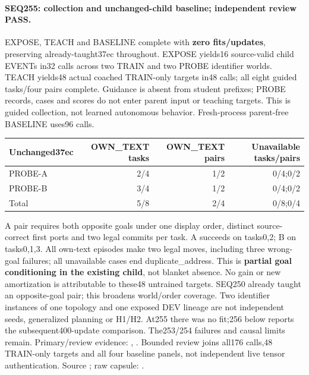 \documentclass{article}
\begin{document}
\paragraph{SEQ255: collection and unchanged-child baseline; independent review PASS.}
EXPOSE, TEACH and BASELINE complete with \textbf{zero fits/updates}, preserving
already-taught37ec throughout. EXPOSE yields16 source-valid child EVENTs
in32 calls across two TRAIN and two PROBE identifier worlds. TEACH yields48
actual coached TRAIN-only targets in48 calls; all eight guided tasks/four pairs
complete. Guidance is absent from student prefixes; PROBE records, cases and
scores do not enter parent input or teaching targets. This is guided collection,
not learned autonomous behavior. Fresh-process parent-free BASELINE uses96 calls.
\begin{center}
\small
\begin{tabular}{lrrr}
\toprule
Unchanged37ec & OWN\_TEXT tasks & OWN\_TEXT pairs & Unavailable tasks/pairs \\
\midrule
PROBE-A & 2/4 & 1/2 & 0/4;0/2 \\
PROBE-B & 3/4 & 1/2 & 0/4;0/2 \\
Total & 5/8 & 2/4 & 0/8;0/4 \\
\bottomrule
\end{tabular}
\end{center}
A pair requires both opposite goals under one display order, distinct
source-correct first ports and two legal commits per task. A succeeds on tasks0,2;
B on tasks0,1,3. All own-text episodes make two legal moves, including three wrong-goal
failures; all unavailable cases end duplicate\_address. This is \textbf{partial
goal conditioning in the existing child}, not blanket absence. No gain or new
amortization is attributable to these48 untrained targets. SEQ250 already taught
an opposite-goal pair; this broadens world/order coverage. Two identifier
instances of one topology and one exposed DEV lineage are not independent
seeds, generalized planning or H1/H2. At255 there was no fit;256 below reports the subsequent400-update comparison.
The253/254 failures and causal limits remain.
Primary/review evidence:
,
.
Bounded review joins all176 calls,48 TRAIN-only targets and all four baseline
panels, not independent live tensor authentication. Source
; raw capsule:
.
\end{document}
